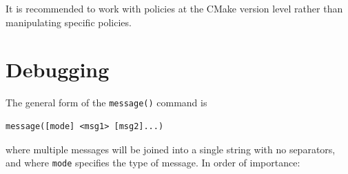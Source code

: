 \documentclass[table, xcdraw]{article}%
\begin{document}
It is recommended to work with policies at the CMake version level rather than manipulating specific policies.

\section{Debugging}

The general form of the \texttt{message()} command is

\begin{verbatim}
message([mode] <msg1> [msg2]...)
\end{verbatim}

where multiple messages will be joined into a single string with no separators, and where \texttt{mode} specifies the type of message. In order of importance:
\end{document}
